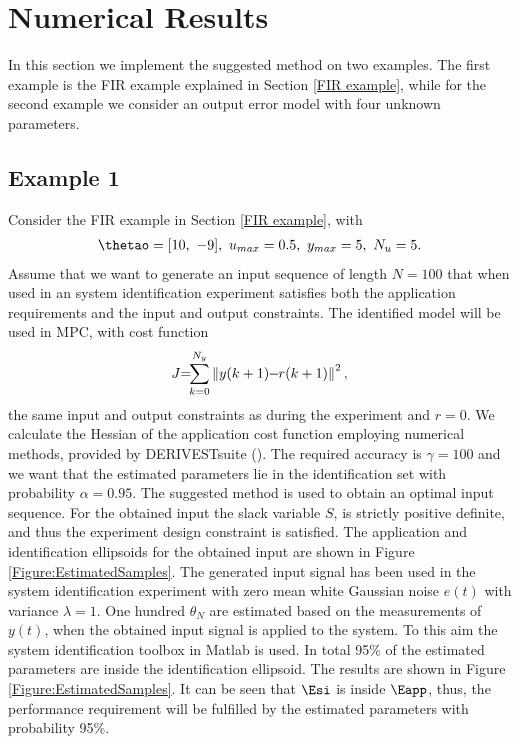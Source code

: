 \documentclass{ifacconf}
\begin{document}
\section{Numerical Results}
\label{sec:Numerical Results}
In this section we implement the suggested method on two examples. The first example is the FIR example explained in Section \ref{FIR example}, while for the second example we consider an output error model with four unknown parameters.
\subsection{Example 1}
Consider the FIR example in Section \ref{FIR example}, with 
\vspace{-0.4cm}
\begin{eqnarray}
\begin{split}
\nonumber
\thetao 	= [10,\ -9]	, \
u_{max} 	= 0.5		, \
y_{max} 	= 5		, \
N_u 		= 5			.
\end{split}
\end{eqnarray}
Assume that we want to generate an input sequence of length $N=100$ that when used in an system identification experiment satisfies both the application requirements and the input and output constraints. The identified model will be used in MPC, with cost function
\begin{equation}
J\hspace{-0.1cm} =\hspace{-0.15cm}\sum^{N_y}_{k=0}\left\|y(k+1)  \hspace{-0.1cm}-\hspace{-0.1cm}  r(k+1)\right\|^{2},
\end{equation}
the same input and output constraints as during the experiment and $r=0$. We calculate the Hessian of the application cost function employing numerical methods, provided by DERIVESTsuite (\cite{DErrico2007}). The required accuracy is $\gamma = 100$ and we want that the estimated parameters lie in the identification set with probability $\alpha = 0.95$. The suggested method is used to obtain an optimal input sequence.  For the obtained input the slack variable $S$, is strictly positive definite, and thus the experiment design constraint is satisfied. The application and identification ellipsoids for the obtained input are shown in Figure \ref{Figure:EstimatedSamples}.
The generated input signal has been used in the system identification experiment with zero mean white Gaussian noise $e(t)$ with variance $\lambda = 1$. One hundred $\hat{\theta}_N$ are estimated based on the measurements of $y(t)$, when the obtained input signal is applied to the system. To this aim the system identification toolbox in Matlab is used. In total 95\% of the estimated parameters are inside the identification ellipsoid. The results are shown in Figure \ref{Figure:EstimatedSamples}. It can be seen that $\Esi$ is inside $\Eapp$, thus, the performance requirement will be fulfilled by the estimated parameters with probability 95\%.
\end{document}
